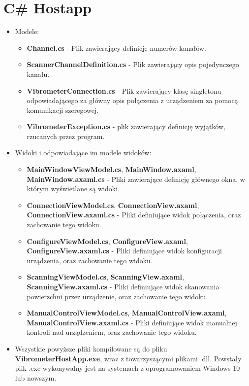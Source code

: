 \section{C\# Hostapp}
\begin{itemize}
    \item Modele:
    \begin{itemize}
        \item \textbf{Channel.cs} - Plik zawierający definicję numerów kanałów.
        \item \textbf{ScannerChannelDefinition.cs} - Plik zawierający opis pojedynczego kanału.
        \item \textbf{VibrometerConnection.cs} - Plik zawierający klasę singletonu odpowiadającego za główny opis połączenia z urządzeniem za pomocą komunikacji szeregowej.
        \item \textbf{VibrometerException.cs} - plik zawierający definicję wyjątków, rzucanych przez program.
    \end{itemize}
    \item Widoki i odpowiadające im modele widoków:
    \begin{itemize}
        \item \textbf{MainWindowViewModel.cs}, \textbf{MainWindow.axaml}, \textbf{MainWindow.axaml.cs} - Pliki zawierające definicję głównego okna, w którym wyświetlane są widoki.
        \item \textbf{ConnectionViewModel.cs}, \textbf{ConnectionView.axaml}, \textbf{ConnectionView.axaml.cs} - Pliki definiujące widok połączenia, oraz zachowanie tego widoku.
        \item \textbf{ConfigureViewModel.cs}, \textbf{ConfigureView.axaml}, \textbf{ConfigureView.axaml.cs} - Pliki definiujące widok konfiguracji urządzenia, oraz zachowanie tego widoku.
        \item \textbf{ScanningViewModel.cs}, \textbf{ScanningView.axaml}, \textbf{ScanningView.axaml.cs} - Pliki definiujące widok skanowania powierzchni przez urządzenie, oraz zachowanie tego widoku.
        \item \textbf{ManualControlViewModel.cs}, \textbf{ManualControlView.axaml}, \textbf{ManualControlView.axaml.cs} - Pliki definiujące widok manualnej kontroli nad urządzeniem, oraz zachowanie tego widoku.
    \end{itemize}
    \item Wszystkie powyższe pliki kompilowane są do pliku \textbf{VibrometerHostApp.exe}, wraz z towarzyszącymi plikami .dll. Powstały plik .exe wykonywalny jest na systemach z oprogramowaniem Windows 10 lub nowszym.
\end{itemize}

